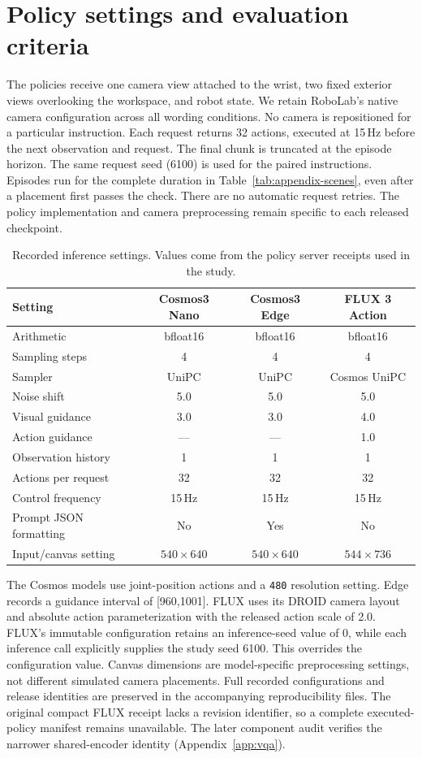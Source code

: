 \documentclass{article}
\begin{document}
\section{Policy settings and evaluation criteria}\label{app:settings}
The policies receive one camera view attached to the wrist, two fixed exterior views overlooking the workspace, and robot state. We retain RoboLab's native camera configuration across all wording conditions. No camera is repositioned for a particular instruction. Each request returns 32 actions, executed at 15\,Hz before the next observation and request. The final chunk is truncated at the episode horizon. The same request seed (6100) is used for the paired instructions. Episodes run for the complete duration in Table~\ref{tab:appendix-scenes}, even after a placement first passes the check. There are no automatic request retries. The policy implementation and camera preprocessing remain specific to each released checkpoint.

\begin{table}[htbp]
\centering\small
\caption{Recorded inference settings. Values come from the policy server receipts used in the study.}
\label{tab:appendix-settings}
\begin{tabular}{@{}lccc@{}}
\toprule Setting & Cosmos3 Nano & Cosmos3 Edge & FLUX 3 Action\\
\midrule
Arithmetic & bfloat16 & bfloat16 & bfloat16\\
Sampling steps & 4 & 4 & 4\\
Sampler & UniPC & UniPC & Cosmos UniPC\\
Noise shift & 5.0 & 5.0 & 5.0\\
Visual guidance & 3.0 & 3.0 & 4.0\\
Action guidance & --- & --- & 1.0\\
Observation history & 1 & 1 & 1\\
Actions per request & 32 & 32 & 32\\
Control frequency & 15\,Hz & 15\,Hz & 15\,Hz\\
Prompt JSON formatting & No & Yes & No\\
Input/canvas setting & $540\!\times\!640$ & $540\!\times\!640$ & $544\!\times\!736$\\
\bottomrule
\end{tabular}
\end{table}

The Cosmos models use joint-position actions and a \texttt{480} resolution setting. Edge records a guidance interval of [960,1001]. FLUX uses its DROID camera layout and absolute action parameterization with the released action scale of 2.0. FLUX's immutable configuration retains an inference-seed value of 0, while each inference call explicitly supplies the study seed 6100. This overrides the configuration value. Canvas dimensions are model-specific preprocessing settings, not different simulated camera placements. Full recorded configurations and release identities are preserved in the accompanying reproducibility files. The original compact FLUX receipt lacks a revision identifier, so a complete executed-policy manifest remains unavailable. The later component audit verifies the narrower shared-encoder identity (Appendix~\ref{app:vqa}).
\end{document}
